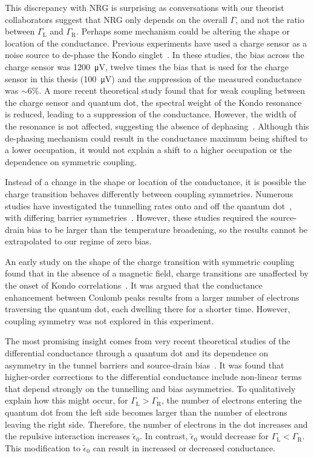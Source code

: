 This discrepancy with NRG is surprising as conversations with our theorist collaborators suggest that NRG only depends on the overall $\Gamma$, and not the ratio between $\Gamma_\mathrm{L}$ and $\Gamma_\mathrm{R}$.
Perhaps some mechanism could be altering the shape or location of the conductance. 
Previous experiments have used a charge sensor as a noise source to de-phase the Kondo singlet~\cite{kondo_controlled_dephasing}. In these studies, the bias across the charge sensor was \qty{1200}{\micro V}, twelve times the bias that is used for the charge sensor in this thesis (\qty{100}{\micro V}) and the suppression of the measured conductance was $\sim6\%$. 
A more recent theoretical study found that for weak coupling between the charge sensor and quantum dot, the spectral weight of the Kondo resonance is reduced, leading to a suppression of the conductance. However, the width of the resonance is not affected, suggesting the absence of dephasing~\cite{peculiar_dephasing_of_kondo}. Although this de-phasing mechanism could result in the conductance maximum being shifted to a lower occupation, it would not explain a shift to a higher occupation or the dependence on symmetric coupling.


Instead of a change in the shape or location of the conductance, it is possible the charge transition behaves differently between coupling symmetries. 
Numerous studies have investigated the tunnelling rates onto and off the quantum dot~\cite{MacLean2007,Ihn2009,Kng2012}, with differing barrier symmetries~\cite{Rogge2005,Gustavsson2006}. However, these studies required the source-drain bias to be larger than the temperature broadening, so the results cannot be extrapolated to our regime of zero bias. 

An early study on the shape of the charge transition with symmetric coupling found that in the absence of a magnetic field, charge transitions are unaffected by the onset of Kondo correlations~\cite{Sprinzak2002}. It was argued that the conductance enhancement between Coulomb peaks results from a larger number of electrons traversing the quantum dot, each dwelling there for a shorter time. However, coupling symmetry was not explored in this experiment. 


 The most promising insight comes from very recent theoretical studies of the differential conductance through a quantum dot and its dependence on asymmetry in the tunnel barriers and source-drain bias~\cite{Tsutsumi2021,kondo_nrg_asymmetric}. 
 It was found that higher-order corrections to the differential conductance include non-linear terms that depend strongly on the tunnelling and bias asymmetries. To qualitatively explain how this might occur, for $\Gamma_\mathrm{L}>\Gamma_\mathrm{R}$, the number of electrons entering the quantum dot from the left side becomes larger than the number of electrons leaving the right side. Therefore, the number of electrons in the dot increases and the repulsive interaction increases $\tilde{\epsilon}_0$. In contrast, $\tilde{\epsilon}_0$ would decrease for $\Gamma_\mathrm{L}<\Gamma_\mathrm{R}$. This modification to $\tilde{\epsilon}_0$ can result in increased or decreased conductance. 

